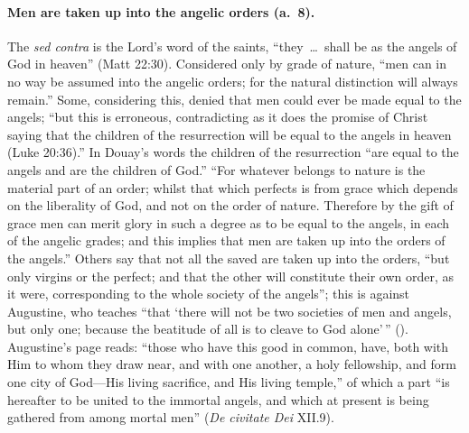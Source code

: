\paragraph{Men are taken up into the angelic orders (a.~8).} The
\emph{sed contra} is the Lord's word of the saints, ``they~\dots\ shall be as
the angels of God in heaven'' (Matt 22:30). Considered only by grade of
nature, ``men can in no way be assumed into the angelic orders; for the
natural distinction will always remain.'' Some, considering this, denied that
men could ever be made equal to the angels; ``but this is erroneous,
contradicting as it does the promise of Christ saying that the children of
the resurrection will be equal to the angels in heaven (Luke 20:36).'' In
Douay's words the children of the resurrection ``are equal to the angels and
are the children of God.'' ``For whatever belongs to nature is the material
part of an order; whilst that which perfects is from grace which depends on
the liberality of God, and not on the order of nature. Therefore by the gift
of grace men can merit glory in such a degree as to be equal to the angels,
in each of the angelic grades; and this implies that men are taken up into
the orders of the angels.'' Others say that not all the saved are taken up
into the orders, ``but only virgins or the perfect; and that the other will
constitute their own order, as it were, corresponding to the whole society of
the angels''; this is against Augustine, who teaches ``that `there will not
be two societies of men and angels, but only one; because the beatitude of
all is to cleave to God alone'\,'' (). Augustine's page
reads: ``those who have this good in common, have, both with Him to whom they
draw near, and with one another, a holy fellowship, and form one city of
God---His living sacrifice, and His living temple,'' of which a part ``is
hereafter to be united to the immortal angels, and which at present is being
gathered from among mortal men'' (\emph{De civitate Dei} XII.9).

